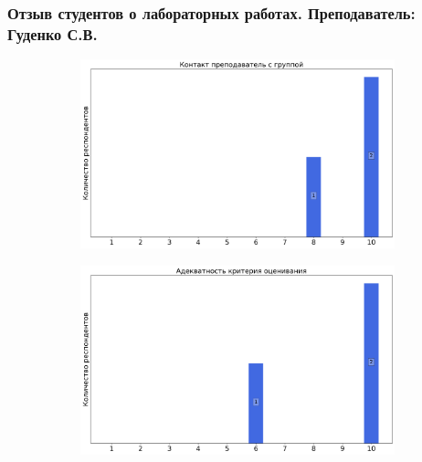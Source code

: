         
                
        \subsubsection{Отзыв студентов о лабораторных работах. Преподаватель: Гуденко С.В.}
            \begin{figure}[H]
                \centering
                \begin{subfigure}[b]{0.45\textwidth}
                    \centering
                    \includegraphics[width=\textwidth]{images/3 course/Общая физика - квантовая физика/labniks-marks-Гуденко С.В.-0.png}
                \end{subfigure}
                \begin{subfigure}[b]{0.45\textwidth}
                    \centering
                    \includegraphics[width=\textwidth]{images/3 course/Общая физика - квантовая физика/labniks-marks-Гуденко С.В.-1.png}
                \end{subfigure}

\end{figure}
